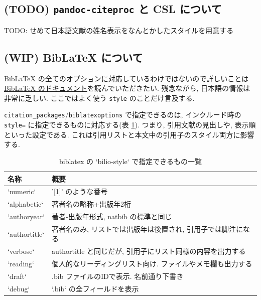 \documentclass[
]{bxjsbook}
\theoremstyle{definition}
\theoremstyle{definition}
\theoremstyle{definition}
\theoremstyle{remark}
\begin{document}
\hypertarget{todo-pandoc-citeproc-ux3068-csl-ux306bux3064ux3044ux3066}{%
\subsection{\texorpdfstring{(TODO) \texttt{pandoc-citeproc} と CSL
について}{(TODO) pandoc-citeproc と CSL について}}\label{todo-pandoc-citeproc-ux3068-csl-ux306bux3064ux3044ux3066}}

TODO: せめて日本語文献の姓名表示をなんとかしたスタイルを用意する

\hypertarget{wip-biblatex-ux306bux3064ux3044ux3066}{%
\subsection{(WIP) BibLaTeX
について}\label{wip-biblatex-ux306bux3064ux3044ux3066}}

BibLaTeX の全てのオプションに対応しているわけではないので詳しいことは
\href{https://www.ctan.org/pkg/biblatex}{BibLaTeX
のドキュメント}を読んでいただきたい. 残念ながら,
日本語の情報は非常に乏しい. ここではよく使う \texttt{style}
のことだけ言及する.

\texttt{citation\_packages}/\texttt{biblatexoptions} で指定できるのは,
インクルード時の \texttt{style=} に指定できるものに対応する(表
\ref{tab:biblatex-styles}). つまり, 引用文献の見出しや,
表示順といった設定である.
これは引用リストと本文中の引用子のスタイル両方に影響する.

\begin{table}

\caption{\label{tab:biblatex-styles}biblatex の `bilio-style` で指定できるもの一覧}
\centering
\begin{tabular}[t]{ll}
\toprule
名称 & 概要\\
\midrule
`numeric` & '[1]' のような番号\\
`alphabetic` & 著者名の略称+出版年2桁\\
`authoryear` & 著者-出版年形式, natbib の標準と同じ\\
`authortitle` & 著者名のみ, リストでは出版年は後置され, 引用子では脚注になる\\
`verbose` & authortitle と同じだが, 引用子にリスト同様の内容を出力する\\
\addlinespace
`reading` & 個人的なリーディングリスト向け. ファイルやメモ欄も出力する\\
`draft` & .bib ファイルのIDで表示. 名前通り下書き\\
`debug` & `.bib` の全フィールドを表示\\
\bottomrule
\end{tabular}
\end{table}
\end{document}
